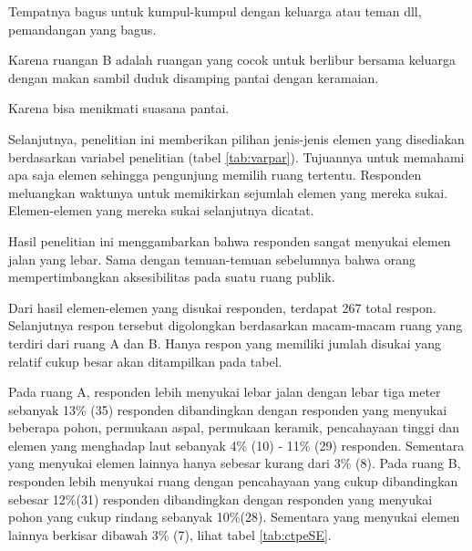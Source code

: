 \documentclass[11pt]{udthesis} %
\begin{document}
\begin{quoting}
    Tempatnya bagus untuk kumpul-kumpul dengan keluarga atau teman dll, pemandangan yang bagus.
\end{quoting}

\begin{quoting}
   Karena ruangan B adalah ruangan yang cocok untuk berlibur bersama keluarga dengan makan sambil duduk disamping pantai dengan keramaian.
\end{quoting}

\begin{quoting}
    Karena bisa menikmati suasana pantai.
\end{quoting}

Selanjutnya, penelitian ini memberikan pilihan jenis-jenis elemen yang disediakan berdasarkan variabel penelitian (tabel \ref{tab:varpar}). Tujuannya untuk memahami apa saja elemen sehingga pengunjung memilih ruang tertentu. Responden meluangkan waktunya untuk memikirkan sejumlah elemen yang mereka sukai. Elemen-elemen yang mereka sukai selanjutnya dicatat.

Hasil penelitian ini menggambarkan bahwa responden sangat menyukai elemen jalan yang lebar. Sama dengan temuan-temuan sebelumnya bahwa orang mempertimbangkan aksesibilitas pada suatu ruang publik.

Dari hasil elemen-elemen yang disukai responden, terdapat 267 total respon. Selanjutnya respon tersebut digolongkan berdasarkan macam-macam ruang yang terdiri dari ruang A dan B. Hanya respon yang memiliki jumlah disukai yang relatif cukup besar akan ditampilkan pada tabel.

Pada ruang A, responden lebih menyukai lebar jalan dengan lebar tiga meter sebanyak 13\% (35) responden dibandingkan dengan responden yang menyukai beberapa pohon, permukaan aspal, permukaan keramik, pencahayaan tinggi dan elemen yang menghadap laut sebanyak 4\% (10) - 11\% (29) responden. Sementara yang menyukai elemen lainnya hanya sebesar kurang dari 3\% (8). Pada ruang B, responden lebih menyukai ruang dengan pencahayaan yang cukup dibandingkan sebesar 12\%(31) responden dibandingkan dengan responden yang menyukai pohon yang cukup rindang sebanyak 10\%(28). Sementara yang menyukai elemen lainnya berkisar dibawah 3\% (7), lihat tabel \ref{tab:ctpeSE}.
\end{document}
